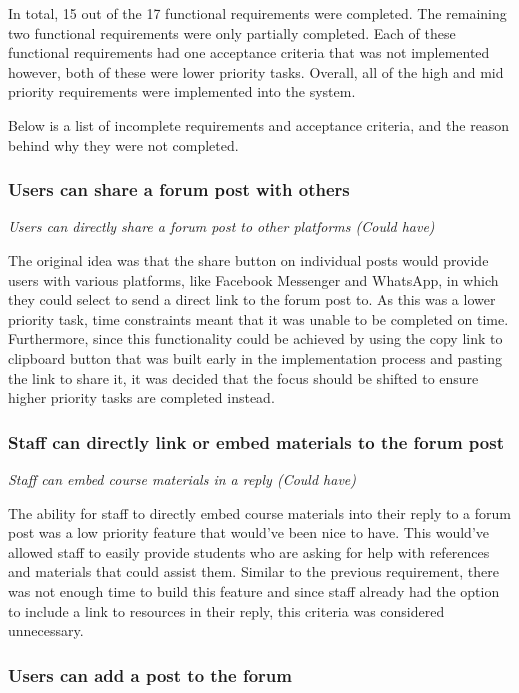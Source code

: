 In total, 15 out of the 17 functional requirements were completed.
The remaining two functional requirements were only partially completed.
Each of these functional requirements had one acceptance criteria that was not implemented however, both of these were lower priority tasks.
Overall, all of the high and mid priority requirements were implemented into the system.

Below is a list of incomplete requirements and acceptance criteria, and the reason behind why they were not completed.

\subsubsection{Users can share a forum post with others}

\textit{Users can directly share a forum post to other platforms (Could have)}

The original idea was that the share button on individual posts would provide users with various platforms, like Facebook Messenger and WhatsApp, in which they could select to send a direct link to the forum post to.
As this was a lower priority task, time constraints meant that it was unable to be completed on time.
Furthermore, since this functionality could be achieved by using the copy link to clipboard button that was built early in the implementation process and pasting the link to share it,
it was decided that the focus should be shifted to ensure higher priority tasks are completed instead.

\subsubsection{Staff can directly link or embed materials to the forum post}

\textit{Staff can embed course materials in a reply (Could have)}

The ability for staff to directly embed course materials into their reply to a forum post was a low priority feature that would've been nice to have.
This would've allowed staff to easily provide students who are asking for help with references and materials that could assist them.
Similar to the previous requirement, there was not enough time to build this feature and since staff already had the option to include a link to resources in their reply, this criteria was considered unnecessary.

\subsubsection{Users can add a post to the forum}

